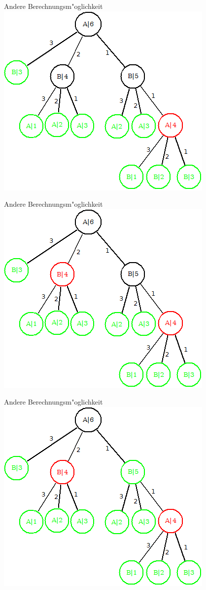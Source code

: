\documentclass[18pt]{beamer}
\begin{document}
\begin{frame}{Andere Berechnungsm"oglichkeit}
\includegraphics[scale=0.4]{baum5.png}
\end{frame}

\begin{frame}{Andere Berechnungsm"oglichkeit}
\includegraphics[scale=0.4]{baum6.png}
\end{frame}

\begin{frame}{Andere Berechnungsm"oglichkeit}
\includegraphics[scale=0.4]{baum7.png}
\end{frame}
\end{document}
